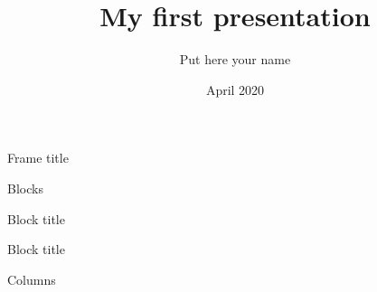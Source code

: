 \documentclass[hyperref={pdfpagemode=FullScreen}]{beamer}
\title{My first presentation}
\author{Put here your name}
\date{April 2020}
\begin{document}
\begin{frame}
\titlepage
\end{frame}
\begin{frame}
 
\end{frame}
\begin{frame}{Frame title}
 
\end{frame}
\begin{frame}{Blocks}
\begin{block}{Block title}
 
\end{block}
\begin{block}{Block title}
 
\end{block}
\end{frame}
\begin{frame}{Columns}
\begin{columns}
\begin{column}{.5\textwidth}
 
\end{column}
\begin{column}{.5\textwidth}
 
\end{column}
\end{columns}
\end{frame}
\end{document}

